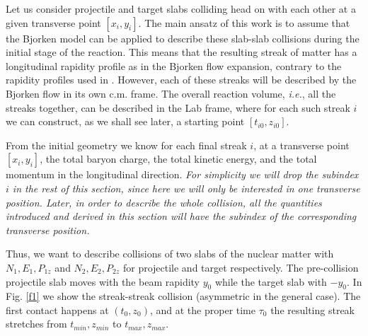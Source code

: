 \documentclass[aps,prc,twocolumn,floatfix,showpacs,a4paper,
nofootinbib,amsmath,amssymb]{revtex4-1}
\begin{document}
Let us consider projectile and target slabs colliding head on with each other at a given transverse point $[x_i,y_i]$.  The main ansatz of this work is to assume that the Bjorken model can be applied to describe these slab-slab collisions during the initial stage of the reaction. This means that  the resulting streak of matter has a longitudinal rapidity profile as in the Bjorken flow expansion, contrary to the rapidity profiles used in \cite{M2001,M2002,MiL2012,Mishustin2011}. However, each of these streaks will be described by the Bjorken flow in its own c.m. frame. The overall reaction volume, {\it i.e.}, all the streaks together, can be described in the Lab frame, where for each such streak $i$ we can construct, as we shall see later,  a starting point $[t_{i0},z_{i0}]$. 


From the initial geometry we know for each final streak $i$, at a transverse point $[x_i,y_i]$, 
the total baryon charge, the total kinetic energy, and the total momentum in the longitudinal direction.   {\it For simplicity we will drop the subindex $i$ in the rest of this section, since here we will only be interested in one transverse position. Later, in order to describe the whole collision, all the quantities introduced and derived in this section will have the subindex of the corresponding transverse position. }
 
Thus, we want to describe collisions of two slabs of the nuclear matter with 
$N_1, E_1, P_{1z}$ and $N_2, E_2, P_{2z}$ for projectile and target respectively. The pre-collision projectile slab moves with the beam rapidity $y_0$ while the target slab
with $-y_0$. In Fig. \ref{f1} we show the streak-streak collision  (asymmetric in the general case). The first contact happens at $(t_0,z_0)$, and at the proper time $\tau_0$ the resulting streak stretches from $t_{min}, z_{min}$ 
to $t_{max}, z_{max}$.
\end{document}
